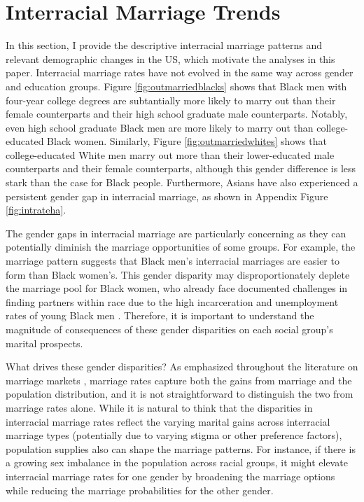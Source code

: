 \section{Interracial Marriage Trends} \label{sec:trends}




 In this section, I provide the descriptive interracial marriage patterns and relevant demographic changes in the US, which motivate the analyses in this paper. Interracial marriage rates have not evolved in the same way across gender and education groups. Figure \ref{fig:outmarriedblacks} shows that Black men with four-year college degrees are subtantially more likely to marry out than their female counterparts and their high school graduate male counterparts. Notably, even high school graduate Black men are more likely to marry out than college-educated Black women. Similarly, Figure \ref{fig:outmarriedwhites} shows that college-educated White men marry out more than their lower-educated male counterparts and their female counterparts, although this gender difference is less stark than the case for Black people. Furthermore, Asians have also experienced a persistent gender gap in interracial marriage, as shown in Appendix Figure \ref{fig:intrateha}.

The gender gaps in interracial marriage are particularly concerning as they can potentially diminish the marriage opportunities of some groups. For example, the marriage pattern suggests that Black men's interracial marriages are easier to form than Black women's. This gender disparity may disproportionately deplete the marriage pool for Black women, who already face documented challenges in finding partners within race due to the high incarceration and unemployment rates of young Black men \citep{CharlesLuoh_2010_MaleIncarcerationMarriage, Mechoulan_2011_ExternalEffectsBlackMaleIncarceration, Liu_2020_Incarceration, CaucuttGunerRauh_2021_BlackWhiteMarraigeGap}. Therefore, it is important to understand the magnitude of consequences of these gender disparities on each social group's marital prospects.  

What drives these gender disparities? As emphasized throughout the literature on marriage markets \citep{ChiapporiSalanie_2016_EconometricsMatching, Schwartz_2013_AssortativeMating}, marriage rates capture both the gains from marriage and the population distribution, and it is not straightforward to distinguish the two from marriage rates alone. While it is natural to think that the disparities in interracial marriage rates reflect the varying marital gains across interracial marriage types (potentially due to varying stigma or other preference factors), population supplies also can shape the marriage patterns. For instance, if there is a growing sex imbalance in the population across racial groups, it might elevate interracial marriage rates for one gender by broadening the marriage options while reducing the marriage probabilities for the other gender.

